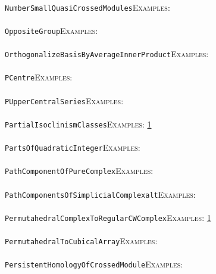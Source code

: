 \documentclass[a4paper,11pt]{report}
\begin{document}
{{ \\
 \texttt{NumberSmallQuasiCrossedModules}{\nobreakspace}{\nobreakspace}{\nobreakspace}{\nobreakspace}\textsc{Examples:} \\
 \\
 \texttt{OppositeGroup}{\nobreakspace}{\nobreakspace}{\nobreakspace}{\nobreakspace}\textsc{Examples:} \\
 \\
 \texttt{OrthogonalizeBasisByAverageInnerProduct}{\nobreakspace}{\nobreakspace}{\nobreakspace}{\nobreakspace}\textsc{Examples:} \\
 \\
 \texttt{PCentre}{\nobreakspace}{\nobreakspace}{\nobreakspace}{\nobreakspace}\textsc{Examples:} \\
 \\
 \texttt{PUpperCentralSeries}{\nobreakspace}{\nobreakspace}{\nobreakspace}{\nobreakspace}\textsc{Examples:} \\
 \\
 \texttt{PartialIsoclinismClasses}{\nobreakspace}{\nobreakspace}{\nobreakspace}{\nobreakspace}\textsc{Examples:} \href{../www/SideLinks/About/aboutBogomolov.html} {1}{\nobreakspace} \\
 \\
 \texttt{PartsOfQuadraticInteger}{\nobreakspace}{\nobreakspace}{\nobreakspace}{\nobreakspace}\textsc{Examples:} \\
 \\
 \texttt{PathComponentOfPureComplex}{\nobreakspace}{\nobreakspace}{\nobreakspace}{\nobreakspace}\textsc{Examples:} \\
 \\
 \texttt{PathComponentsOfSimplicialComplex{\textunderscore}alt}{\nobreakspace}{\nobreakspace}{\nobreakspace}{\nobreakspace}\textsc{Examples:} \\
 \\
 \texttt{PermutahedralComplexToRegularCWComplex}{\nobreakspace}{\nobreakspace}{\nobreakspace}{\nobreakspace}\textsc{Examples:} \href{../www/SideLinks/About/aboutPeripheral.html} {1}{\nobreakspace} \\
 \\
 \texttt{PermutahedralToCubicalArray}{\nobreakspace}{\nobreakspace}{\nobreakspace}{\nobreakspace}\textsc{Examples:} \\
 \\
 \texttt{PersistentHomologyOfCrossedModule}{\nobreakspace}{\nobreakspace}{\nobreakspace}{\nobreakspace}\textsc{Examples:} \\
 \\
}}
\end{document}

